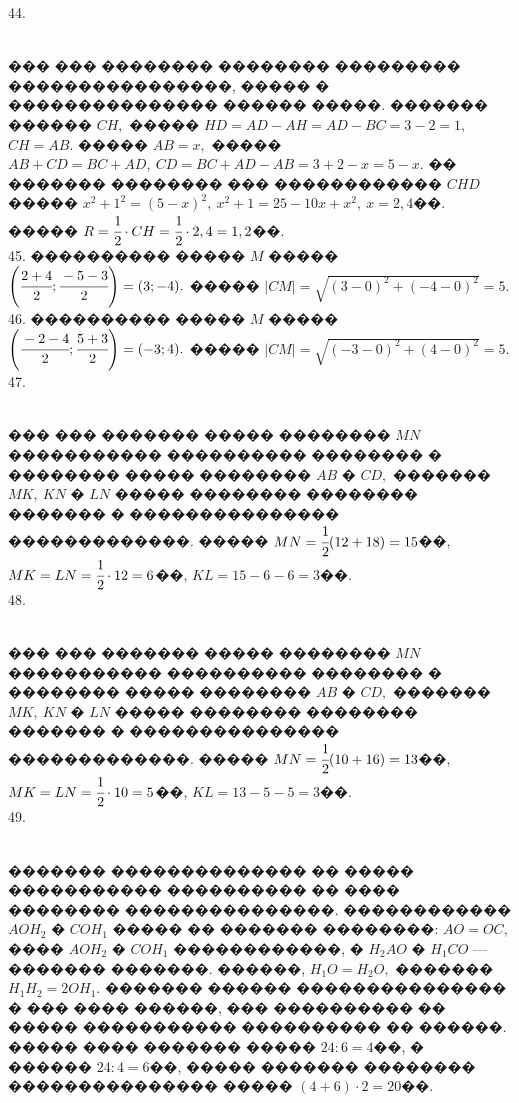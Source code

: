 \documentclass[12pt]{article}
\begin{document}
44. \begin{figure}[ht!]
\end{figure}\\
��� ��� �������� �������� ��������� ����������������, ����� � ��������������� ������ �����. ������� ������ $CH,$ ����� $HD=AD-AH=AD-BC=3-2=1,$ $CH=AB.$ ����� $AB=x,$ ����� $AB+CD=BC+AD,\ CD=BC+AD-AB=3+2-x=5-x.$ �� ������� �������� ��� ������������ $CHD$ ����� $x^2+1^2=(5-x)^2,\ x^2+1=25-10x+x^2,\ x=2,4$��. ����� $R=\cfrac{1}{2}\cdot CH=\cfrac{1}{2}\cdot 2,4=1,2$��.\\
45. ���������� ����� $M$ ����� $\left(\cfrac{2+4}{2};\cfrac{-5-3}{2}\right)=(3;-4).$ ����� $|CM|=\sqrt{(3-0)^2+(-4-0)^2}=5.$\\
46. ���������� ����� $M$ ����� $\left(\cfrac{-2-4}{2};\cfrac{5+3}{2}\right)=(-3;4).$ ����� $|CM|=\sqrt{(-3-0)^2+(4-0)^2}=5.$\\
47. \begin{figure}[ht!]
\end{figure}\\
��� ��� ������� ����� �������� $MN$ ����������� ���������� �������� � �������� ����� �������� $AB$ � $CD,$ ������� $MK,\ KN$ � $LN$ ����� �������� �������� ������� � ��������������� �������������. ����� $MN=\cfrac{1}{2}(12+18)=15$��, $MK=LN=\cfrac{1}{2}\cdot12=6$��, $KL=15-6-6=3$��.\\
48. \begin{figure}[ht!]
\end{figure}\\
��� ��� ������� ����� �������� $MN$ ����������� ���������� �������� � �������� ����� �������� $AB$ � $CD,$ ������� $MK,\ KN$ � $LN$ ����� �������� �������� ������� � ��������������� �������������. ����� $MN=\cfrac{1}{2}(10+16)=13$��, $MK=LN=\cfrac{1}{2}\cdot10=5$��, $KL=13-5-5=3$��.\\
49. \begin{figure}[ht!]
\end{figure}\\
������� �������������� �� ����� ����������� ���������� �� ���� �������� ���������������. ������������ $AOH_2$ � $COH_1$ ����� �� ������� ��������: $AO=OC,$ ���� $AOH_2$ � $COH_1$ ������������, � $H_2AO$ � $H_1CO$ --- ������� �������. ������, $H_1O=H_2O,$ ������� $H_1H_2=2OH_1.$ ������� ������ ��������������� � ��� ���� ������, ��� ���������� �� ����� ����������� ���������� �� ������. ����� ���� ������� ����� $24:6=4$��, � ������ $24:4=6$��, ����� ������� �������� ��������������� ����� $(4+6)\cdot2=20$��.\\
\end{document}
